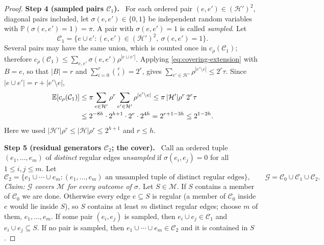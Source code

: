 \documentclass[11pt,letterpaper]{article}
\theoremstyle{definition}
\theoremstyle{remark}
\numberwithin{equation}{section}
\newcommand{\step}[1]{\par\medskip\noindent\textbf{#1}\ }
\begin{document}
\begin{proof}
\step{Step 4 (sampled pairs $\mathcal C_1$).}
For each ordered pair \((e,e')\in(\mathcal H')^2\), diagonal pairs
included, let $\sigma(e,e')\in\{0,1\}$ be independent random variables with
$\mathbb P(\sigma(e,e')=1)=\pi$. A pair with $\sigma(e,e')=1$ is called
\emph{sampled}. Let
\[
\mathcal C_1=\{e\cup e':(e,e')\in(\mathcal H')^2,\ \sigma(e,e')=1\}.
\]
Several pairs may have the same union, which is counted once in
$c_\rho(\mathcal C_1)$; therefore
$c_\rho(\mathcal C_1)\le\sum_{e,e'}\sigma(e,e')\rho^{|e\cup e'|}$.
Applying \eqref{eq:covering-extension} with \(B=e\), so that \(|B|=r\) and
$\sum_{i=0}^r\binom ri=2^r$, gives
$\sum_{e'\in\mathcal H'}\rho^{|e'\setminus e|}\le2^r\tau$. Since
$|e\cup e'|=r+|e'\setminus e|$,
\begin{align}
\mathbb E[c_\rho(\mathcal C_1)]
&\le\pi\sum_{e\in\mathcal H'}\rho^{r}
    \sum_{e'\in\mathcal H'}\rho^{|e'\setminus e|}
\le\pi\,|\mathcal H'|\rho^r\,2^r\tau
\notag\\
&\le2^{-8h}\cdot2^{h+1}\cdot2^{r}\cdot2^{4h}
=2^{r+1-3h}\le2^{1-2h}.
\label{eq:covering-pair-cost}
\end{align}
Here we used $|\mathcal H'|\rho^r\le|\mathcal H|\rho^r\le2^{h+1}$ and
$r\le h$.

\step{Step 5 (residual generators $\mathcal C_2$; the cover).}
Call an ordered tuple \((e_1,\ldots,e_m)\) of \emph{distinct} regular
edges \emph{unsampled} if $\sigma(e_i,e_j)=0$ for all $1\le i,j\le m$. Let
\[
\mathcal C_2=\{e_1\cup\cdots\cup e_m:
 (e_1,\ldots,e_m)\text{ an unsampled tuple of distinct regular edges}\},
\qquad
\mathcal G=\mathcal C_0\cup\mathcal C_1\cup\mathcal C_2 .
\]
\emph{Claim: $\mathcal G$ covers $\mathcal M$ for every outcome of
$\sigma$.} Let $S\in\mathcal M$. If $S$ contains a member of
$\mathcal C_0$ we are done. Otherwise every edge $e\subseteq S$ is regular
(a member of $\mathcal C_0$ inside $e$ would lie inside $S$), so $S$
contains at least $m$ distinct regular edges; choose $m$ of them,
$e_1,\ldots,e_m$. If some pair $(e_i,e_j)$ is sampled, then
$e_i\cup e_j\in\mathcal C_1$ and $e_i\cup e_j\subseteq S$. If no pair is
sampled, then $e_1\cup\cdots\cup e_m\in\mathcal C_2$ and it is contained in
$S$.


\end{proof}
\end{document}
